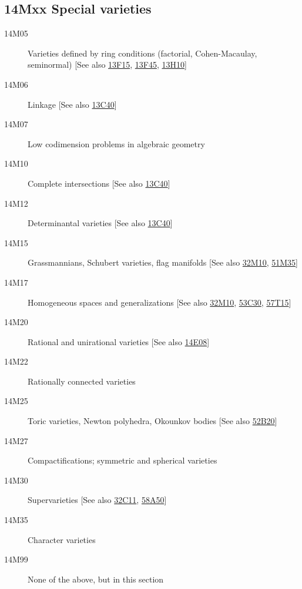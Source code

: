 \documentclass[letterpaper]{article}
\begin{document}
\subsection*{14Mxx Special varieties }\label{14Mxx}
\begin{description}               
\item [14M05]\label{14M05} Varieties defined by ring conditions (factorial, Cohen-Macaulay, seminormal) [See also \hyperref[13F15]{13F15}, \hyperref[13F45]{13F45}, \hyperref[13H10]{13H10}]
\item [14M06]\label{14M06} Linkage [See also \hyperref[13C40]{13C40}]
\item [14M07]\label{14M07} Low codimension problems in algebraic geometry
\item [14M10]\label{14M10} Complete intersections [See also \hyperref[13C40]{13C40}]
\item [14M12]\label{14M12} Determinantal varieties [See also \hyperref[13C40]{13C40}]
\item [14M15]\label{14M15} Grassmannians, Schubert varieties, flag manifolds [See also \hyperref[32M10]{32M10}, \hyperref[51M35]{51M35}]
\item [14M17]\label{14M17} Homogeneous spaces and generalizations [See also \hyperref[32M10]{32M10}, \hyperref[53C30]{53C30}, \hyperref[57T15]{57T15}]
\item [14M20]\label{14M20} Rational and unirational varieties [See also \hyperref[14E08]{14E08}]
\item [14M22]\label{14M22} Rationally connected varieties
\item [14M25]\label{14M25} Toric varieties, Newton polyhedra, Okounkov bodies [See also \hyperref[52B20]{52B20}]
\item [14M27]\label{14M27} Compactifications; symmetric and spherical varieties
\item [14M30]\label{14M30} Supervarieties [See also \hyperref[32C11]{32C11}, \hyperref[58A50]{58A50}]
\item [14M35]\label{14M35} Character varieties
\item [14M99]\label{14M99} None of the above, but in this section
\end{description}          
\end{document}
